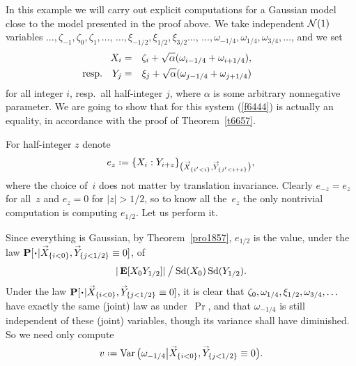 \begin{Xpl}\label{xplOptZZ}
In this example we will carry out explicit computations for a Gaussian model
close to the model presented in the proof above.
%
We take independent $\mathcal{N}(1)$ variables $\ldots,\zeta_{-1},\zeta_0,\zeta_1,\ldots$,
$\ldots,\xi_{-1/2},\xi_{1/2},\xi_{3/2}\ldots$,
$\ldots,\omega_{-1/4},\omega_{1/4},\omega_{3/4},\ldots$,
and we set
%
\begin{eqnarray}
X_i &=& \zeta_i + \sqrt{\alpha} (\omega_{i-1/4} + \omega_{i+1/4}) , \\
\llap{resp.\quad} Y_j &=& \xi_j + \sqrt{\alpha} (\omega_{j-1/4} + \omega_{j+1/4})
\end{eqnarray}
for all integer $i$, resp.\ all half-integer $j$,
where $\alpha$ is some arbitrary nonnegative parameter.
We are going to show that for this system (\ref{f6444}) is actually an equality,
in accordance with the proof of Theorem~\ref{t6657}.

For half-integer $z$ denote
\[ e_z \coloneqq \{ X_i : Y_{i+z} \}%
_{\mathlarger{(}\vec{X}_{\{i'<i\}},\vec{Y}_{\{j'<i+z\}}\mathlarger{)}} ,\]
where the choice of~$i$ does not matter by translation invariance.
Clearly $e_{-z} = e_z$ for all~$z$ and $e_z = 0$ for $|z| > 1/2$,
so to know all the~$e_z$ the only nontrivial computation is computing $e_{1/2}$.
Let us perform it.

Since everything is Gaussian, by Theorem~\ref{pro1857}, $e_{1/2}$ is the value,
under the law $\Pr[\Bcdot|\ab \vec{X}_{\{i<0\}},\vec{Y}_{\{j<1/2\}} \equiv0]$, of
\[\label{forVespr} |\EE[X_0Y_{1/2}]| \mathbin{\big/} \ecty(X_0)\ecty(Y_{1/2}) .\]
%
Under the law $\Pr[\Bcdot|\vec{X}_{\{i<0\}},\vec{Y}_{\{j<1/2\}} \equiv0]$,
it is clear that $\zeta_0,\allowbreak \omega_{1/4},\allowbreak \xi_{1/2},\allowbreak \omega_{3/4},\ldots$
have exactly the same (joint) law as under~$\Pr$,
and that $\omega_{-1/4}$ is still independent of these (joint) variables,
though its variance shall have diminished.
So we need only compute
\[ v \coloneqq \Var\big(\omega_{-1/4}\big|\vec{X}_{\{i<0\}},\vec{Y}_{\{j<1/2\}} \equiv0\big) .\]


\end{Xpl}
